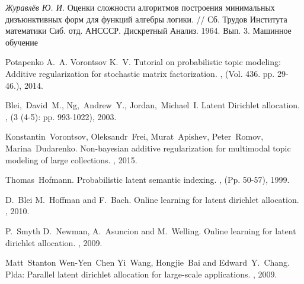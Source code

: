 \documentclass[12pt,a4paper,oneside,fleqn,leqno]{article}
\theoremstyle{definition}
\begin{document}
\renewcommand{\bibname}{Список литературы}
\addcontentsline{toc}{section}{\bibname}


\def\BibUrl#1.{}\def\BibAnnote#1.{}


\begin{thebibliography}{1}

{\it Журавлёв Ю. И.} Оценки сложности алгоритмов построения минимальных дизъюнктивных форм для функций алгебры логики. // Сб. Трудов Института математики Сиб. отд. АНСССР. Дискретный Анализ. 1964. Вып. 3.
\newblock Машинное обучение

Potapenko A.~A. Vorontsov K.~V.
\newblock Tutorial on probabilistic topic modeling: Additive regularization for stochastic matrix factorization.
, (Vol. 436. pp. 29-46.), 2014.

Blei,~David~M., Ng,~Andrew~Y., Jordan,~Michael~I.
\newblock Latent Dirichlet allocation.
, (3 (4-5): pp. 993-1022), 2003.

 Konstantin~Vorontsov, Oleksandr~Frei, Murat~Apishev, Peter~Romov, Marina~Dudarenko.
\newblock Non-bayesian additive regularization for multimodal topic modeling of large collections.
, 2015.

Thomas~Hofmann.
\newblock Probabilistic latent semantic indexing.
, (Pp. 50-57), 1999.

D.~Blei M.~Hoffman and F.~Bach.
\newblock Online learning for latent dirichlet allocation.
, 2010.

P.~Smyth D.~Newman, A.~Asuncion and M.~Welling.
\newblock Online learning for latent dirichlet allocation.
, 2009.

Matt~Stanton Wen-Yen~Chen Yi~Wang, Hongjie~Bai and Edward~Y.~Chang.
\newblock Plda: Parallel latent dirichlet allocation for large-scale applications.
, 2009.


\end{thebibliography}
\end{document}
